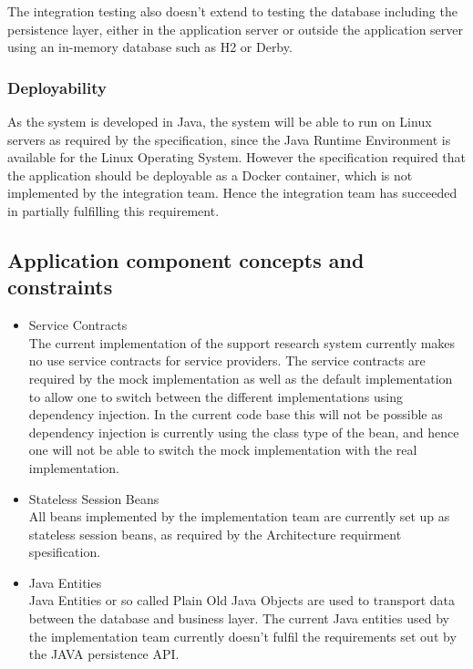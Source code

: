 \documentclass[a4paper,10pt]{article}
\begin{document}
The integration testing also doesn't extend to testing the database including the persistence layer, either in the application server or outside the application server using an in-memory database such as H2 or Derby.

\subsubsection{Deployability}
As the system is developed in Java, the system will be able to run on Linux servers as required by the specification, since the Java Runtime Environment is available for the Linux Operating System.  However the specification required that the application should be deployable as a Docker container,
which is not implemented by the integration team.  Hence the integration team has succeeded in partially fulfilling this requirement.

\subsection{Application component concepts and constraints}
\begin{itemize}
	\item Service Contracts\\
	The current implementation of the support research system currently makes no use service contracts for service providers. The service contracts are required by the mock implementation as well as the default implementation to allow one to switch between the different implementations using dependency injection. In the current code base this will not be possible as dependency injection is currently using the class type of the bean, and hence one will not be able to switch the mock implementation with the real implementation.

	\item Stateless Session Beans\\
	All beans implemented by the implementation team are currently set up as stateless session beans, as required by the Architecture requirment spesification.

	\item Java Entities\\
	Java Entities or so called Plain Old Java Objects are used to transport data between the database and business layer. The current Java entities used by the implementation team currently doesn't fulfil the requirements set out by the  JAVA persistence API.
\end{itemize}
\end{document}
